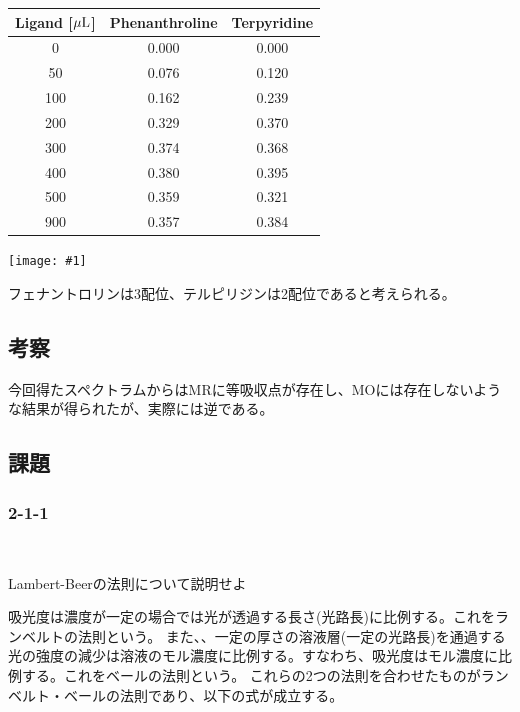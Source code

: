 \documentclass[a4paper,papersize,dvipdfmx]{jsarticle}
\newcommand{\pict}[2]{\begin{center} \texttt{[image: \#1]} \end{center}}   %
\begin{document}
\begin{table}[H]
\begin{center}
\begin{tabular}{|c|c|c|}
\hline
Ligand [$\rm \mu L$] & Phenanthroline & Terpyridine \\ \hline
0               & 0.000          & 0.000       \\ \hline
50              & 0.076          & 0.120       \\ \hline
100             & 0.162          & 0.239       \\ \hline
200             & 0.329          & 0.370       \\ \hline
300             & 0.374          & 0.368       \\ \hline
400             & 0.380          & 0.395       \\ \hline
500             & 0.359          & 0.321       \\ \hline
900             & 0.357          & 0.384       \\ \hline
\end{tabular}
\end{center}
\end{table}


\pict{imgs/sp.png}{12}

フェナントロリンは3配位、テルピリジンは2配位であると考えられる。

\subsection*{考察}
今回得たスペクトラムからはMRに等吸収点が存在し、MOには存在しないような結果が得られたが、実際には逆である。

\subsection*{課題}

\subsubsection*{2-1-1}

\

\begin{tcolorbox}[colback=white,colbacktitle=black!10!white,coltitle=black,title={1}]
Lambert-Beerの法則について説明せよ
\end{tcolorbox}

吸光度は濃度が一定の場合では光が透過する長さ(光路長)に比例する。これをランベルトの法則という。
また、、一定の厚さの溶液層(一定の光路長)を通過する光の強度の減少は溶液のモル濃度に比例する。すなわち、吸光度はモル濃度に比例する。これをベールの法則という。
これらの2つの法則を合わせたものがランベルト・ベールの法則であり、以下の式が成立する。
\end{document}
